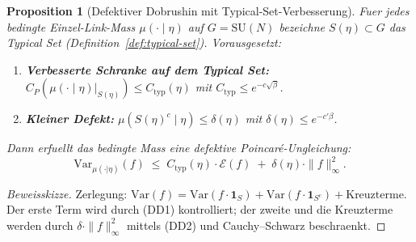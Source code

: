 \documentclass[12pt,a4paper]{article}
\theoremstyle{definition}
\theoremstyle{plain}
\newtheorem{proposition}[definition]{Proposition}
\theoremstyle{remark}
\begin{document}
\begin{proposition}[Defektiver Dobrushin mit Typical-Set-Verbesserung]\label{prop:defective-dobrushin}
Fuer jedes bedingte Einzel-Link-Mass $\mu(\cdot \mid \eta)$ auf $G = \mathrm{SU}(N)$ bezeichne $S(\eta) \subset G$ das Typical Set (Definition~\ref{def:typical-set}). Vorausgesetzt:
\begin{enumerate}
\item[\textup{(DD1)}] \textbf{Verbesserte Schranke auf dem Typical Set:} $C_P(\mu(\cdot \mid \eta)|_{S(\eta)}) \leq C_{\mathrm{typ}}(\eta)$ mit $C_{\mathrm{typ}} \leq e^{-c\sqrt{\beta}}$.
\item[\textup{(DD2)}] \textbf{Kleiner Defekt:} $\mu(S(\eta)^c \mid \eta) \leq \delta(\eta)$ mit $\delta(\eta) \leq e^{-c'\beta}$.
\end{enumerate}
Dann erfuellt das bedingte Mass eine \emph{defektive Poincar\'e-Ungleichung}:
\begin{equation}\label{eq:defective-poincare}
  \mathrm{Var}_{\mu(\cdot|\eta)}(f) \;\leq\; C_{\mathrm{typ}}(\eta) \cdot \mathcal{E}(f) \;+\; \delta(\eta) \cdot \|f\|_\infty^2.
\end{equation}
\end{proposition}

\begin{proof}[Beweisskizze]
Zerlegung: $\mathrm{Var}(f) = \mathrm{Var}(f \cdot \mathbf{1}_S) + \mathrm{Var}(f \cdot \mathbf{1}_{S^c}) + \text{Kreuzterme}$. Der erste Term wird durch (DD1) kontrolliert; der zweite und die Kreuzterme werden durch $\delta \cdot \|f\|_\infty^2$ mittels (DD2) und Cauchy--Schwarz beschraenkt.
\end{proof}
\end{document}
